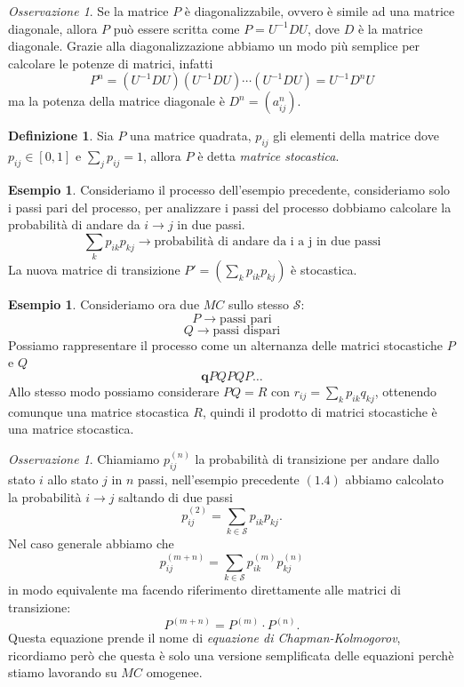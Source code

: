 \documentclass{article}
\theoremstyle{definition}
\theoremstyle{definition}
\newtheorem{definition}[theorem]{Definizione}
\newtheorem{example}[theorem]{Esempio}
\theoremstyle{remark}
\newtheorem{remark}[theorem]{Osservazione}
\begin{document}
\begin{remark}
    Se la matrice $P$ è diagonalizzabile, ovvero è simile ad una matrice diagonale, allora $P$ può essere
    scritta come $P=U^{-1}DU$, dove $D$ è la matrice diagonale. Grazie alla diagonalizzazione abbiamo un modo
    più semplice per calcolare le potenze di matrici, infatti
    $$P^n = (U^{-1}DU)(U^{-1}DU)\dotsb (U^{-1}DU) = U^{-1}D^nU$$
    ma la potenza della matrice diagonale è $D^n = (a_{ij}^n)$.
\end{remark}
\begin{definition}
    Sia $P$ una matrice quadrata, $p_{ij}$ gli elementi della matrice dove $p_{ij}\in[0,1]$ e $\sum_j p_{ij} = 1$,
    allora $P$ è detta \textit{matrice stocastica}.
\end{definition}
\begin{example}
    Consideriamo il processo dell'esempio precedente, consideriamo solo i passi pari del processo, per analizzare i passi del processo dobbiamo calcolare
    la probabilità di andare da $i\to j$ in due passi.
    $$\sum_k p_{ik}p_{kj}\rightarrow\text{probabilità di andare da i a j in due passi}$$
    La nuova matrice di transizione $P' = (\sum_k p_{ik}p_{kj})$  è stocastica.
\end{example}
\begin{example}
    Consideriamo ora due $MC$ sullo stesso $\mathcal{S}$:
    $$ P\to \text{passi pari}$$
    $$ Q\to \text{passi dispari}$$
    Possiamo rappresentare il processo come un alternanza delle matrici stocastiche $P$ e $Q$
    $$\boldsymbol{q}PQPQP\dots$$
    Allo stesso modo possiamo considerare  $PQ=R$ con $r_{ij} = \sum_k p_{ik}q_{kj}$, ottenendo comunque una matrice stocastica $R$,
    quindi il prodotto di matrici stocastiche è una matrice stocastica.
\end{example}
\begin{remark}
    Chiamiamo $p^{(n)}_{ij}$ la probabilità di transizione per andare dallo stato $i$ allo stato $j$ in $n$ passi,
    nell'esempio precedente $\mathbf{(1.4)}$ abbiamo calcolato la probabilità $i\to j$ saltando di due passi
    $$ p^{(2)}_{ij} = \sum_{k\in\mathcal{S}} p_{ik}p_{kj}.$$
    Nel caso generale abbiamo che
    $$p^{(m+n)}_{ij} = \sum_{k\in\mathcal{S}} p^{(m)}_{ik} p^{(n)}_{kj}$$
    in modo equivalente ma facendo riferimento direttamente alle matrici di transizione:
    $$P^{(m+n)} = P^{(m)}\cdot P^{(n)}.$$
    Questa equazione prende il nome di \textit{equazione di Chapman-Kolmogorov}, ricordiamo però che questa è solo una
    versione semplificata delle equazioni perchè stiamo lavorando su $MC$ omogenee.
\end{remark}
\end{document}

